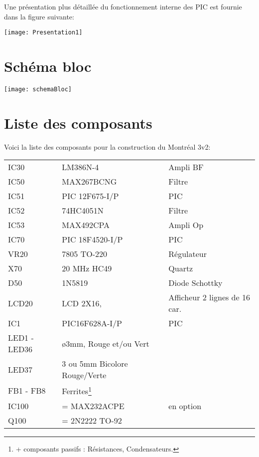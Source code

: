Une présentation plus détaillée du fonctionnement interne des PIC est fournie dans la figure suivante:


\texttt{[image: Presentation1]}
\parindent=15pt


\section{Schéma bloc}

\texttt{[image: schemaBloc]}
\parindent=15pt

\section{Liste des composants}
Voici la liste des composants pour la construction du Montréal 3v2:

\begin{tabular}{ l l l}

IC30&          LM386N-4&                  Ampli BF\\
IC50&          MAX267BCNG&          Filtre\\
IC51& PIC  12F675-I/P& PIC \\
IC52&          74HC4051N&               Filtre\\
IC53&          MAX492CPA &            Ampli Op\\
IC70& PIC  18F4520-I/P& PIC\\
VR20 &       7805 TO-220  &            Régulateur\\
X70&           20 MHz  HC49&           Quartz\\
D50&           1N5819       &                Diode Schottky\\
LCD20&      LCD 2X16,&                 Afficheur 2 lignes de 16 car.\\
IC1& PIC16F628A-I/P& PIC\\
LED1 - LED36& ø3mm, Rouge et/ou Vert&\\
LED37&                        3 ou 5mm Bicolore Rouge/Verte &\\
FB1 - FB8&                   Ferrites\footnote{+ composants passifs : Résistances, Condensateurs.}&\\
IC100&        = MAX232ACPE&        en option\\
Q100 &        = 2N2222 TO-92&\\
\end{tabular}
\parindent=15pt

